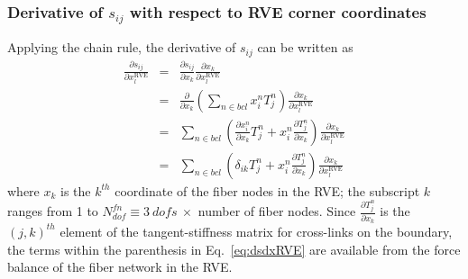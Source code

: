 \subsubsection{Derivative of $s_{ij}$ with respect to RVE corner coordinates}
%
Applying the chain rule, the derivative of $s_{ij}$ can be written as
%
\begin{eqnarray}
\frac{\partial s_{ij}}{\partial x_l^{\text{RVE}}} &=& \frac{\partial s_{ij}}{\partial x_k}\frac{\partial x_k}{\partial x_l^{\text{RVE}}} \nonumber\\ 
%
&=& \frac{\partial}{\partial x_k} \left(\sum_{n \in bcl} x_i^{n} T_j^n \right) \frac{\partial x_k}{\partial x_l^{\text{RVE}}} \nonumber\\
%
&=&\sum_{n \in bcl} \left( \frac{\partial x_i^{n}}{\partial x_k} T_j^n + x_i^n \frac{\partial T_j^n}{\partial x_k}  \right) \frac{\partial x_k}{\partial x_l^{\text{RVE}}} \nonumber\\
%
&=&\sum_{n \in bcl} \left( \delta_{ik} T_j^n + x_i^n \frac{\partial T_j^n}{\partial x_k}  \right) \frac{\partial x_k}{\partial x_l^{\text{RVE}}}
\label{eq:dsdxRVE}
\end{eqnarray}
%
where $x_k$ is the $k^{th}$ coordinate of the fiber nodes in the RVE; the subscript $k$ ranges from 1 to $N_{dof}^{fn} \equiv 3 \ dofs \ \times$ number of fiber nodes. Since $\frac{\partial T_j^n}{\partial x_k}$ is the $(j,k)^{th}$ element of the tangent-stiffness matrix for cross-links on the boundary, the terms within the parenthesis in Eq.\ \eqref{eq:dsdxRVE} are available from the force balance of the fiber network in the RVE. 


